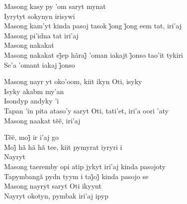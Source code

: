 \smallskip
 \begin{center}\end{center}
 \smallskip
\noindent Masong kasy py 'om saryt mynat\\
Iyrytyt sokynyn irisywi\\
Masong kam’yt kinda pasoj tasok j̃ong j̃ong eem tat, iri’aj\\
Masong pi'idna tat iri'aj\\
Masong nakakat\\
Masong nakakat ej̃ep hãraj̃ ’oman iakajt j̃onso tao’it tykiri\\
Se’a ’omant iakaj j̃onso

\smallskip
 \begin{center}\end{center}
 \smallskip
\noindent Masong nayr yt oko'oom, kiit ikyn Oti, isyky\\
Isyky akabm my'an\\
Isondyp andyky 'i\\
Tapan 'in pita ataso'y saryt Oti, tati'et, iri'a oori 'aty\\
Masong naakat tẽẽ, iri’aj

\smallskip
 \begin{center}\end{center}
 \smallskip
\noindent Tẽẽ, moj̃ ir i’aj go\\
Moj̃ hã hã hã tee, kiit pymyrat iyryri i\\
Nayryt\\
Masong taeremby opi atip jykyt iri'aj kinda pasojoty\\
Tapymbangã pydn tyym i taj̃oj̃ kinda pasojo se\\
Masong nayryt saryt Oti ikyynt\\
Nayryt okotyn, pymbak iri'aj ipyp

